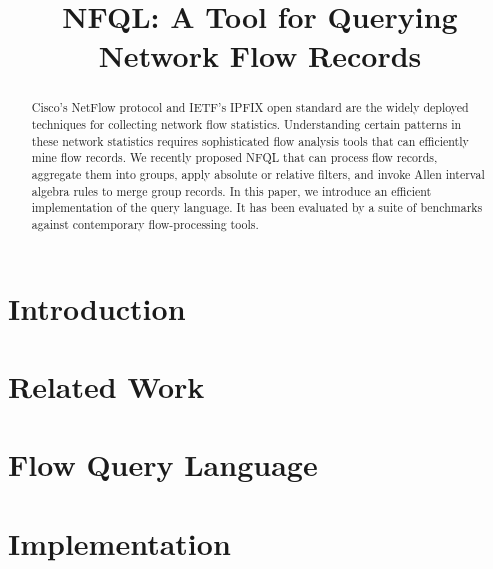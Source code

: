 \documentclass[10pt, conference]{IEEEtran}
\begin{document}
\title{NFQL: A Tool for Querying Network Flow Records}
\author{ }

\maketitle

\begin{acronym}
\end{acronym}


\begin{abstract} Cisco's NetFlow protocol and IETF's IPFIX open standard are
  the widely deployed techniques for collecting network flow statistics.
  Understanding certain patterns in these network statistics requires
  sophisticated flow analysis tools that can efficiently mine flow records. We
  recently proposed \ac{NFQL} that can process flow records, aggregate them
  into groups, apply absolute or relative filters, and invoke Allen interval
  algebra rules to merge group records. In this paper, we introduce an
  efficient implementation of the query language.  It has been evaluated by a
  suite of benchmarks against contemporary flow-processing
  tools.\end{abstract}



\section{Introduction}
\label{sec:introduction}
\section{Related Work}
\label{sec:relatedwork}
\section{Flow Query Language}
\label{sec:design}
\section{Implementation}\label{sec:implementation}

\end{document}
